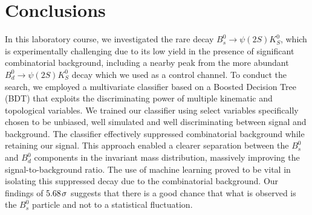\chapter*{Conclusions}\label{chap:conclusion}

In this laboratory course, we investigated the rare decay $B^{0}_{s} \xrightarrow{} \psi(2S)K^{0}_{S}$, which is experimentally challenging due to its low yield in the presence of significant combinatorial background, including a nearby peak from the more abundant $B^{0}_d \xrightarrow{} \psi(2S)K^{0}_{S}$ decay which we used as a control channel. To conduct the search, we employed a multivariate classifier based on a Boosted Decision Tree (BDT) that exploits the discriminating power of multiple kinematic and topological variables. We trained our classifier using select variables specifically chosen to be unbiased, well simulated and well discriminating between signal and background. The classifier effectively suppressed combinatorial background while retaining our signal. This approach enabled a clearer separation between the $B^{0}_{s}$ and $B^{0}_{d}$ components in the invariant mass distribution, massively improving the signal-to-background ratio. The use of machine learning proved to be vital in isolating this suppressed decay due to the combinatorial background. Our findings of $5.68 \hspace{0.1em} \sigma$ suggests that there is a good chance that what is observed is the $B^{0}_{s}$ particle and not to a statistical fluctuation.
